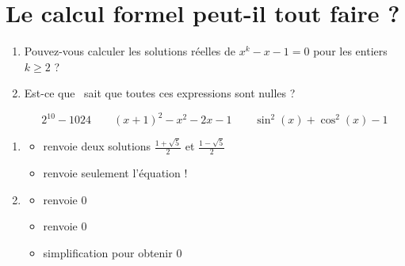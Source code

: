\section{Le calcul formel peut-il tout faire ?}

\begin{frame}[fragile]
\begin{tp}
\begin{enumerate}
  \item Pouvez-vous calculer les solutions réelles de $x^k-x-1=0$ pour les entiers $k \ge 2$ ?
  \item Est-ce que \Sage\ sait que toutes ces expressions sont nulles ?
  
  \vspace*{-4ex}
  $$2^{10} - 1024 \qquad (x+1)^2-x^2-2x-1 \qquad \sin^2(x)+\cos^2(x) - 1$$
\end{enumerate}  
\end{tp}

\pause

\begin{enumerate}
\item 
  \begin{itemize}
    \item {} renvoie deux solutions
$\frac{1+\sqrt5}{2}$ et $\frac{1-\sqrt5}{2}$
\pause
    \item {} renvoie seulement l'équation !
  \end{itemize}

\pause

\item 

\begin{itemize}
    \item {} renvoie $0$ 
    \pause

    \item {} renvoie $0$ 
    \pause

    \item 
    
    \pause
     simplification pour obtenir $0$
  \end{itemize}


\end{enumerate}

\end{frame}



